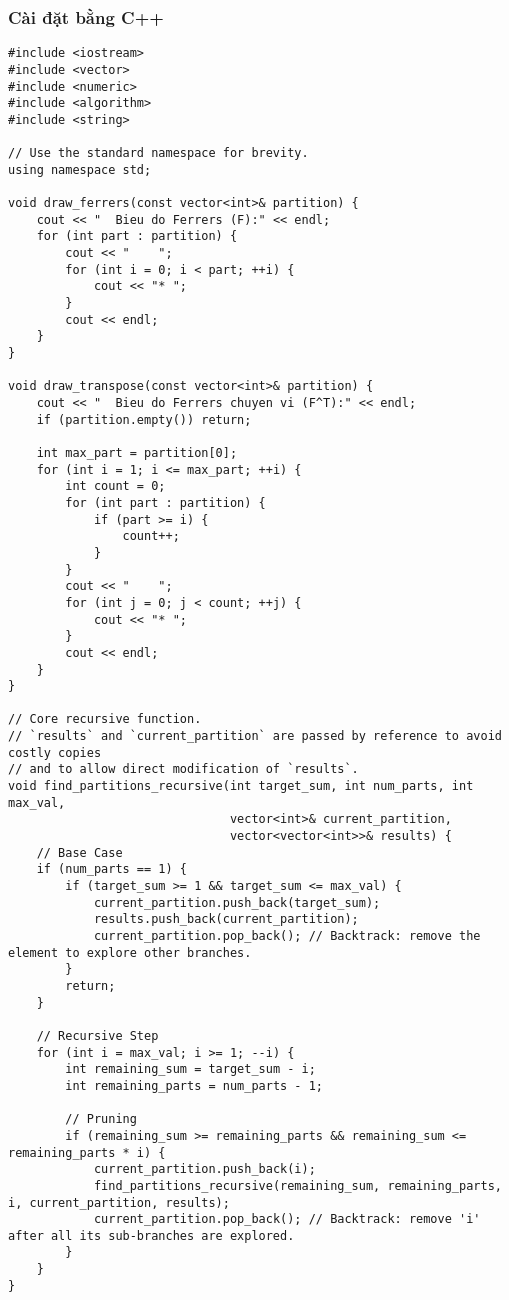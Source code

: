 \documentclass[a4paper,12pt]{article}
\begin{document}
\subsubsection{Cài đặt bằng C++}
\begin{lstlisting}[style=cppstyle, caption={Partition enumeration and Ferrers diagrams in C++.}, label={lst:cpp_partition_eng}]
#include <iostream>
#include <vector>
#include <numeric>
#include <algorithm>
#include <string>

// Use the standard namespace for brevity.
using namespace std;

void draw_ferrers(const vector<int>& partition) {
    cout << "  Bieu do Ferrers (F):" << endl;
    for (int part : partition) {
        cout << "    ";
        for (int i = 0; i < part; ++i) {
            cout << "* ";
        }
        cout << endl;
    }
}

void draw_transpose(const vector<int>& partition) {
    cout << "  Bieu do Ferrers chuyen vi (F^T):" << endl;
    if (partition.empty()) return;

    int max_part = partition[0];
    for (int i = 1; i <= max_part; ++i) {
        int count = 0;
        for (int part : partition) {
            if (part >= i) {
                count++;
            }
        }
        cout << "    ";
        for (int j = 0; j < count; ++j) {
            cout << "* ";
        }
        cout << endl;
    }
}

// Core recursive function.
// `results` and `current_partition` are passed by reference to avoid costly copies
// and to allow direct modification of `results`.
void find_partitions_recursive(int target_sum, int num_parts, int max_val,
                               vector<int>& current_partition,
                               vector<vector<int>>& results) {
    // Base Case
    if (num_parts == 1) {
        if (target_sum >= 1 && target_sum <= max_val) {
            current_partition.push_back(target_sum);
            results.push_back(current_partition);
            current_partition.pop_back(); // Backtrack: remove the element to explore other branches.
        }
        return;
    }

    // Recursive Step
    for (int i = max_val; i >= 1; --i) {
        int remaining_sum = target_sum - i;
        int remaining_parts = num_parts - 1;

        // Pruning
        if (remaining_sum >= remaining_parts && remaining_sum <= remaining_parts * i) {
            current_partition.push_back(i);
            find_partitions_recursive(remaining_sum, remaining_parts, i, current_partition, results);
            current_partition.pop_back(); // Backtrack: remove 'i' after all its sub-branches are explored.
        }
    }
}


\end{lstlisting}
\end{document}
